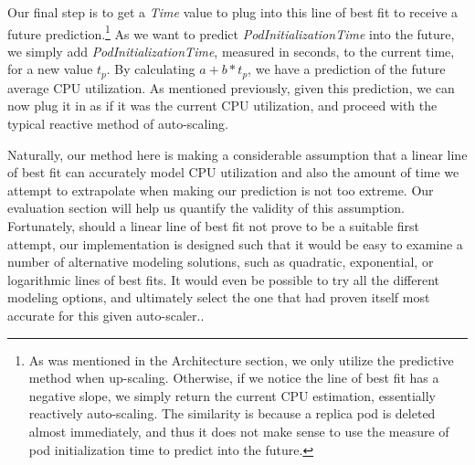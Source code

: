 Our final step is to get a \textit{Time} value to plug into this line of best
fit to receive a future prediction.\footnote{As was mentioned in the
Architecture section, we only utilize the predictive method when up-scaling.
Otherwise, if we notice the line of best fit has a negative slope, we simply
return the current CPU estimation, essentially reactively auto-scaling. The
similarity is because a replica pod is deleted almost immediately, and thus it
does not make sense to use the measure of pod initialization time to predict
into the future.} As we want to predict
\textit{PodInitializationTime} into the future, we simply add
\textit{PodInitializationTime}, measured in seconds, to the current time, for a
new value $t_{p}$. By calculating $a + b * t_{p}$, we have a prediction of the
future average CPU utilization. As mentioned previously, given this prediction,
we can now plug it in as if it was the current CPU utilization, and proceed with
the typical reactive method of auto-scaling.

Naturally, our method here is making a considerable assumption that a linear
line of best fit can accurately model CPU utilization and also the amount of
time we attempt to extrapolate when making our prediction is not too extreme.
Our evaluation section will help us quantify the validity of this assumption.
Fortunately, should a linear line of best fit
not prove to be a suitable first attempt, our implementation is designed such
that it would be easy to examine a number of alternative modeling solutions,
such as quadratic, exponential, or logarithmic lines of best fits. It would even
be possible to try all the different modeling options, and ultimately select
the one that had proven itself most accurate for this given auto-scaler..
